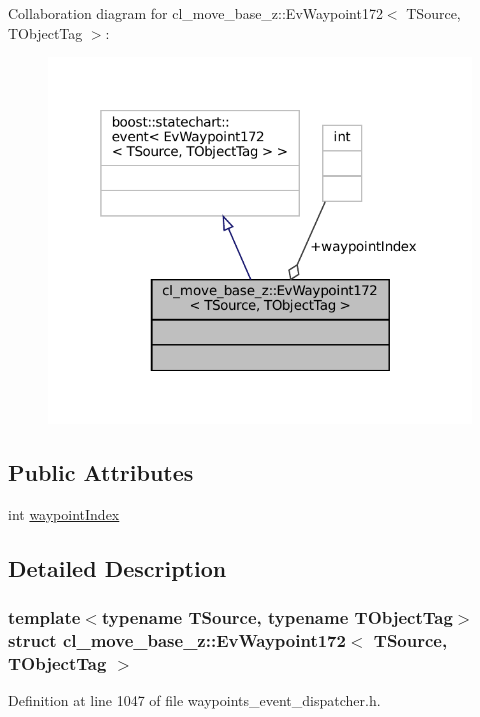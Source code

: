 Collaboration diagram for cl\+\_\+move\+\_\+base\+\_\+z\+:\+:Ev\+Waypoint172$<$ T\+Source, T\+Object\+Tag $>$\+:
\nopagebreak
\begin{figure}[H]
\begin{center}
\leavevmode
\includegraphics[width=319pt]{structcl__move__base__z_1_1EvWaypoint172__coll__graph}
\end{center}
\end{figure}
\subsection*{Public Attributes}
\begin{DoxyCompactItemize}
\item 
int \hyperlink{structcl__move__base__z_1_1EvWaypoint172_a4c4c168e2036935ea118a100f2df71e3}{waypoint\+Index}
\end{DoxyCompactItemize}


\subsection{Detailed Description}
\subsubsection*{template$<$typename T\+Source, typename T\+Object\+Tag$>$\newline
struct cl\+\_\+move\+\_\+base\+\_\+z\+::\+Ev\+Waypoint172$<$ T\+Source, T\+Object\+Tag $>$}



Definition at line 1047 of file waypoints\+\_\+event\+\_\+dispatcher.\+h.



